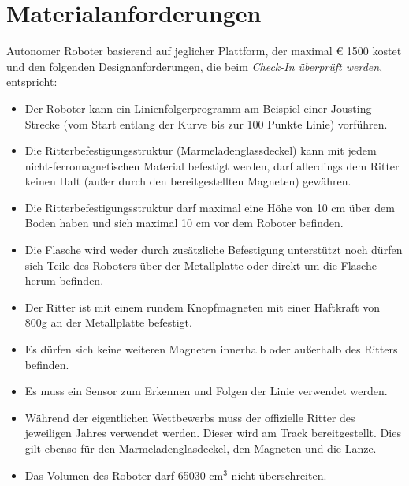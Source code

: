 \documentclass[a4paper,12pt]{article}
\begin{document}
\section{Materialanforderungen}
Autonomer Roboter basierend auf jeglicher Plattform, der maximal  \euro{ 1500} kostet und den folgenden
Designanforderungen, die beim \emph{Check-In überprüft werden}, entspricht:
\begin{itemize}
\item Der Roboter kann ein Linienfolgerprogramm am Beispiel einer Jousting-Strecke (vom Start entlang der Kurve
bis zur 100 Punkte Linie) vorführen.
\item Die Ritterbefestigungsstruktur (Marmeladenglassdeckel) kann mit jedem nicht-ferromagnetischen Material
befestigt werden, darf allerdings dem Ritter keinen Halt (außer durch den bereitgestellten Magneten)
gewähren.
\item Die Ritterbefestigungsstruktur darf maximal eine Höhe von 10 cm über dem Boden haben und sich maximal 10 cm vor dem Roboter befinden.
\item Die Flasche wird weder durch zusätzliche Befestigung unterstützt noch dürfen sich Teile des Roboters über der Metallplatte oder direkt um die Flasche herum befinden.
\item Der Ritter ist mit einem rundem Knopfmagneten mit einer Haftkraft von 800g an der Metallplatte befestigt.
\item Es dürfen sich keine weiteren Magneten innerhalb oder außerhalb des Ritters befinden.
\item Es muss ein Sensor zum Erkennen und Folgen der Linie verwendet werden.
\item Während der eigentlichen Wettbewerbs muss der offizielle Ritter des jeweiligen Jahres verwendet werden.
Dieser wird am Track bereitgestellt. Dies gilt ebenso für den Marmeladenglasdeckel, den Magneten und die
Lanze.
\item Das Volumen des Roboter darf 65030 cm$^{3}$ nicht überschreiten.
\end{itemize}
\end{document}
